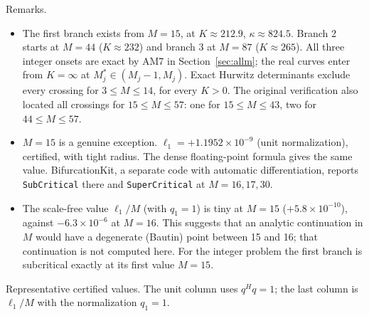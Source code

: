 \documentclass[11pt,a4paper]{report}
\begin{document}
Remarks.
\begin{itemize}
\tightlist
\item The first branch exists from \(M=15\), at \(K\approx212.9\), \(\kappa\approx824.5\).
Branch 2 starts at \(M=44\) (\(K\approx232\)) and branch 3 at \(M=87\) (\(K\approx265\)).
All three integer onsets are exact by AM7 in Section~\ref{sec:allm}; the real curves enter
from \(K=\infty\) at \(M_j^*\in(M_j-1,M_j)\). Exact Hurwitz determinants exclude every
crossing for \(3\le M\le14\), for every \(K>0\). The original verification also located
all crossings for \(15\le M\le57\): one for \(15\le M\le43\), two for \(44\le M\le57\).
\item \(M=15\) is a genuine exception. \(\ell_1=+1.1952\times10^{-9}\) (unit normalization), certified, with tight
radius. The dense floating-point formula gives the same value. BifurcationKit, a separate code with automatic
differentiation, reports \texttt{SubCritical} there and \texttt{SuperCritical} at \(M=16,17,30\).
\item The scale-free value \(\ell_1/M\) (with \(q_1=1\)) is tiny at \(M=15\) (\(+5.8\times10^{-10}\)), against
\(-6.3\times10^{-6}\) at \(M=16\). This suggests that an analytic continuation in \(M\) would have a degenerate
(Bautin) point between 15 and 16; that continuation is not computed here. For the integer problem the first
branch is subcritical exactly at its first value \(M=15\).
\end{itemize}

Representative certified values. The unit column uses \(q^Hq=1\); the last column is
\(\ell_1/M\) with the normalization \(q_1=1\).
\end{document}
